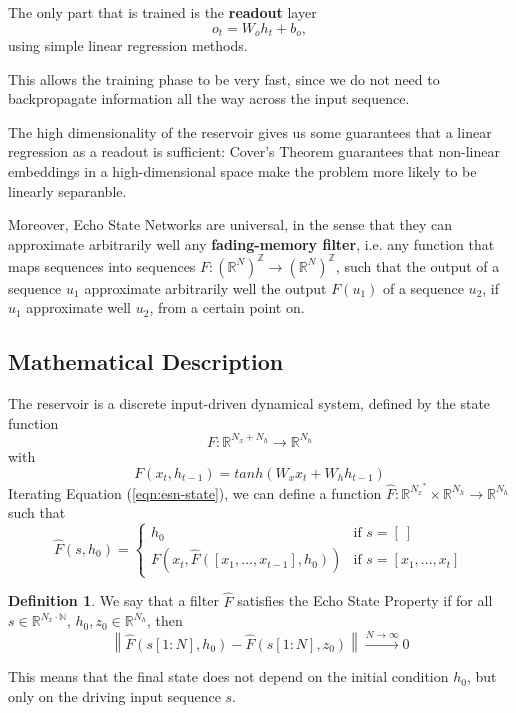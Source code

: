 \documentclass[oneside]{book}
\newcommand{\R}{\mathbb{R}}
\theoremstyle{definition}
\newtheorem{defn}{Definition}
\theoremstyle{plain}
\begin{document}
The only part that is trained is the \textbf{readout} layer
\[
    o_t=W_oh_t +b_o,
\]
using simple linear regression methods.

This allows the training phase to be very fast, since we do not need to backpropagate information all the way across the input sequence.

The high dimensionality of the reservoir gives us some guarantees that a linear regression as a readout is sufficient: Cover's Theorem guarantees that non-linear embeddings  in a high-dimensional space make the problem more likely to be linearly separanble.

Moreover, Echo State Networks are universal, in the sense that they can approximate arbitrarily well any \textbf{fading-memory filter}, i.e. any function that maps sequences into sequences
$F: (\R^{N})^\mathbb Z\to   (\R^{N})^\mathbb Z$, such that the output of a sequence $u_1$ approximate arbitrarily well the output $F(u_1)$ of a sequence $u_2$, if $u_1$ approximate well $u_2$, from a certain point on.

\subsection{Mathematical Description}
The reservoir is a discrete input-driven dynamical system, defined by the state function
\begin{equation}\label{eqn:esn-state}
    F:\R^{N_x+N_h}\to \R^{N_h}
\end{equation}
with
\begin{equation}\label{eqn:esn}
    F(x_t, h_{t-1})=tanh(W_x x_t+ W_h h_{t-1})
\end{equation}
Iterating Equation (\ref{eqn:esn-state}), we can define a function $\hat{F}:\R^{{N_x}^*}\times \R^{N_h}\to \R^{N_h}$   such that
\[
    \hat{F}(s, h_{0}) =
    \begin{cases}
        h_0 & \text{if }s=[\:]\\
        F\left(x_t, \hat{F}([x_1,...,x_{t-1}], h_0)\right) & \text{if } s=[x_1,...,x_t]
    \end{cases}
\]
\begin{defn}\label{def:esn}
    We say that a filter $\hat{F}$ satisfies the Echo State Property if for all $s\in \R^{{N_x}\cdot \mathbb{N}}$, $h_0, z_0\in \R^{N_h}$, then
    \begin{equation}\label{eqn:esp}
        \left\|\hat{F}\left(s[1:N], h_0\right) - \hat{F}\left(s[1:N], z_0\right)\right\|\xrightarrow{N\to \infty} 0
    \end{equation}
\end{defn}
This means that the final state does not depend on the initial condition $h_0$, but only on the driving input sequence $s$.
\end{document}
